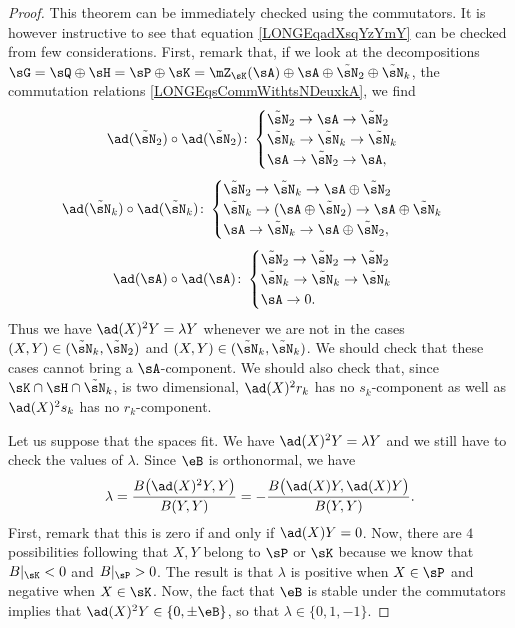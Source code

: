 \begin{proof}
	This theorem can be immediately checked using the commutators. It is however instructive to see that equation \eqref{LONGEqadXsqYzYmY} can be checked from few considerations. First, remark that, if we look at the decompositions $\sG=\sQ\oplus\sH=\sP\oplus\sK=\mZ_{\sK}(\sA)\oplus\sA\oplus\tilde\sN_2\oplus\tilde\sN_k$, the commutation relations \eqref{LONGEqsCommWithtsNDeuxkA}, we find
	\begin{equation}
		\ad(\tilde\sN_2)\circ\ad(\tilde\sN_2)\colon
		\begin{cases}
			\tilde\sN_2\to\sA\to\tilde\sN_2\\
			\tilde\sN_k\to\tilde\sN_k\to\tilde\sN_k\\
			\sA\to\tilde\sN_2\to\sA,
		\end{cases}	
	\end{equation}
	\begin{equation}
		\ad(\tilde\sN_k)\circ\ad(\tilde\sN_k)\colon
		\begin{cases}
			\tilde\sN_2\to\tilde\sN_k\to\sA\oplus\tilde\sN_2\\
			\tilde\sN_k\to(\sA\oplus\tilde\sN_2)\to\sA\oplus\tilde\sN_k\\
			\sA\to\tilde\sN_k\to\sA\oplus\tilde\sN_2,
		\end{cases}
	\end{equation}
	\begin{equation}
		\ad(\sA)\circ\ad(\sA)\colon
		\begin{cases}
			\tilde\sN_2\to\tilde\sN_2\to\tilde\sN_2\\
			\tilde\sN_k\to\tilde\sN_k\to\tilde\sN_k\\
			\sA\to 0.
		\end{cases}
	\end{equation}
	Thus we have $\ad(X)^2Y=\lambda Y$ whenever we are not in the cases $(X,Y)\in(\tilde\sN_k,\tilde\sN_2)$ and $(X,Y)\in(\tilde\sN_k,\tilde\sN_k)$. We should check that these cases cannot bring a $\sA$-component. We should also check that, since $\sK\cap\sH\cap\tilde\sN_k$, is two dimensional, $\ad(X)^2r_k$ has no $s_k$-component as well as $\ad(X)^2s_k$ has no $r_k$-component.

	Let us suppose that the spaces fit. We have $\ad(X)^2Y=\lambda Y$ and we still have to check the values of $\lambda$. Since $\eB$ is orthonormal, we have
	\begin{equation}
		\lambda=\frac{ B\big( \ad(X)^2Y,Y \big) }{ B(Y,Y) }=-\frac{ B\big( \ad(X)Y,\ad(X)Y \big) }{ B(Y,Y) }.
	\end{equation}
	First, remark that this is zero if and only if $\ad(X)Y=0$. Now, there are $4$ possibilities following that $X,Y$ belong to $\sP$ or $\sK$ because we know that $B|_{\sK}<0$ and $B|_{\sP}>0$. The result is that $\lambda$ is positive when $X\in\sP$ and negative when $X\in\sK$. Now, the fact that $\eB$ is stable under the commutators implies that $\ad(X)^2Y\in\{ 0,\pm \eB \}$, so that $\lambda\in\{ 0,1,-1 \}$.
\end{proof}
